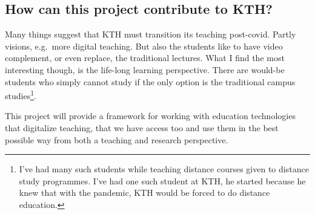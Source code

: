 %
%
%


\subsection{How can this project contribute to KTH?}

%
%

Many things suggest that KTH must transition its teaching post-covid.
Partly visions, e.g.~more digital teaching.
But also the students like to have video complement, or even replace, the 
traditional lectures.
What I find the most interesting though, is the life-long learning perspective.
There are would-be students who simply cannot study if the only option is the 
traditional campus studies\footnote{%
  I've had many such students while teaching distance courses given to distance 
  study programmes.
  I've had one such student at KTH, he started because he knew that with the 
  pandemic, KTH would be forced to do distance education.
}.

This project will provide a framework for working with education technologies 
that digitalize teaching, that we have access too and use them in the best 
possible way from both a teaching and research perspective.

